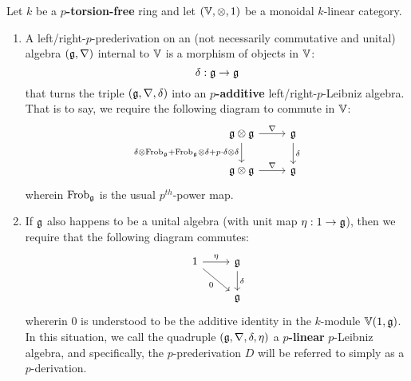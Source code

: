            \begin{definition} \label{def: arithmetic_leibniz_algebras}
                Let $k$ be a \textbf{$p$-torsion-free} ring and let $(\V, \tensor, 1)$ be a monoidal $k$-linear category. 
                    \begin{enumerate}
                        \item A left/right-$p$-prederivation on an (not necessarily commutative and unital) algebra $\left(\mathfrak{g}, \nabla\right)$ internal to $\mathbb{V}$ is a morphism of objects in $\mathbb{V}$:
                            $$\delta: \mathfrak{g} \to \mathfrak{g}$$
                        that turns the triple $\left(\mathfrak{g}, \nabla, \delta\right)$ into an \textbf{$p$-additive} left/right-$p$-Leibniz algebra. That is to say, we require the following diagram to commute in $\mathbb{V}$:
                            $$
                                \begin{tikzcd}
                                	{\g \tensor \g} & {\g} \\
                                	{\g \tensor \g} & {\g}
                                	\arrow["{\delta}", from=1-2, to=2-2]
                                	\arrow["{\nabla}", from=2-1, to=2-2]
                                	\arrow["{\nabla}", from=1-1, to=1-2]
                                	\arrow["{\delta \tensor \Frob_{\g} + \Frob_{\g} \tensor \delta + p \cdot \delta \tensor \delta}"', from=1-1, to=2-1]
                                \end{tikzcd}
                            $$
                        wherein $\mathrm{Frob}_{\mathfrak{g}}$ is the usual $p^{th}$-power map.
                        \item If $\mathfrak{g}$ also happens to be a unital algebra (with unit map $\eta: 1 \to \mathfrak{g}$), then we require that the following diagram commutes:
                            $$
                                \begin{tikzcd}
                                	{1} & {\g} \\
                                	& {\g}
                                	\arrow["{\delta}", from=1-2, to=2-2]
                                	\arrow["{\eta}", from=1-1, to=1-2]
                                	\arrow["{0}"', from=1-1, to=2-2]
                                \end{tikzcd}
                            $$
                        whererin $0$ is understood to be the additive identity in the $k$-module $\mathbb{V}(1, \mathfrak{g})$. In this situation, we call the quadruple $(\mathfrak{g}, \nabla, \delta, \eta)$ a \textbf{$p$-linear} $p$-Leibniz algebra, and specifically, the $p$-prederivation $D$ will be referred to simply as a $p$-derivation.
                    \end{enumerate}
            \end{definition}
